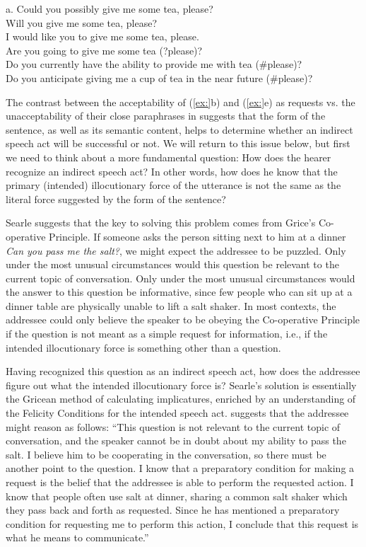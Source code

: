 \ea






  a. Could you possibly give me some tea, please?\\
\ex Will you give me some tea, please?\\
\ex I would like you to give me some tea, please.\\
\ex Are you going to give me some tea (?please)?\\
\ex Do you currently have the ability to provide me with tea (\#please)?\\
\ex Do you anticipate giving me a cup of tea in the near future (\#please)?
\z


The contrast between the acceptability of (\ref{ex:}b) and (\ref{ex:}e) as requests vs. the unacceptability of their close paraphrases in  suggests that the form of the sentence, as well as its semantic content, helps to determine whether an indirect speech act will be successful or not. We will return to this issue below, but first we need to think about a more fundamental question: How does the hearer recognize an indirect speech act? In other words, how does he know that the primary (intended) illocutionary force of the utterance is not the same as the literal force suggested by the form of the sentence?



Searle suggests that the key to solving this problem comes from Grice’s Co-operative Principle. If someone asks the person sitting next to him at a dinner \textit{Can you pass me the salt?}, we might expect the addressee to be puzzled. Only under the most unusual circumstances would this question be relevant to the current topic of conversation. Only under the most unusual circumstances would the answer to this question be informative, since few people who can sit up at a dinner table are physically unable to lift a salt shaker. In most contexts, the addressee could only believe the speaker to be obeying the Co-operative Principle if the question is not meant as a simple request for information, i.e., if the intended illocutionary force is something other than a question.



Having recognized this question as an indirect speech act, how does the addressee figure out what the intended illocutionary force is? Searle’s solution is essentially the Gricean method of calculating implicatures, enriched by an understanding of the Felicity Conditions for the intended speech act. \citet{Searle1975} suggests that the addressee might reason as follows: “This question is not relevant to the current topic of conversation, and the speaker cannot be in doubt about my ability to pass the salt. I believe him to be cooperating in the conversation, so there must be another point to the question. I know that a preparatory condition for making a request is the belief that the addressee is able to perform the requested action. I know that people often use salt at dinner, sharing a common salt shaker which they pass back and forth as requested. Since he has mentioned a preparatory condition for requesting me to perform this action, I conclude that this request is what he means to communicate.”



